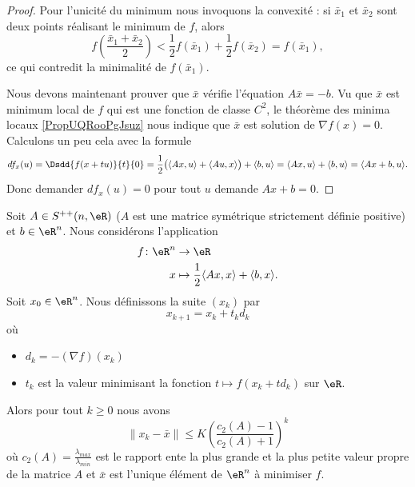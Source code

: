 \begin{proof}
    Pour l'unicité du minimum nous invoquons la convexité : si \( \bar x_1\) et \( \bar x_2\) sont deux points réalisant le minimum de \( f\), alors
    \begin{equation}
        f\left( \frac{ \bar x_1+\bar x_2 }{2} \right)<\frac{ 1 }{2}f(\bar x_1)+\frac{ 1 }{2}f(\bar x_2)=f(\bar x_1),
    \end{equation}
    ce qui contredit la minimalité de \( f(\bar x_1)\).

    Nous devons maintenant prouver que \( \bar x\) vérifie l'équation \( A\bar x=-b\). Vu que \( \bar x\) est minimum local de \( f\) qui est une fonction de classe \( C^2\), le théorème des minima locaux \ref{PropUQRooPgJsuz} nous indique que \( \bar x\) est solution de \( \nabla f(x)=0\). Calculons un peu cela avec la formule
    \begin{equation}
        df_x(u)=\Dsdd{ f(x+tu) }{t}{0}=\frac{ 1 }{2}\big( \langle Ax, u\rangle +\langle Au, x\rangle  \big)+\langle b, u\rangle =\langle Ax, u\rangle +\langle b, u\rangle =\langle Ax+b, u\rangle .
    \end{equation}
    Donc demander \( df_x(u)=0\) pour tout \( u\) demande \( Ax+b=0\).
\end{proof}

\begin{proposition} \label{PropSOOooGoMOxG}
    Soit \( A\in S^{++}(n,\eR)\) (\( A\) est une matrice symétrique strictement définie positive) et \( b\in \eR^n\). Nous considérons l'application
    \begin{equation}
        \begin{aligned}
            f\colon \eR^n&\to \eR \\
            x&\mapsto \frac{ 1 }{2}\langle Ax, x\rangle +\langle b, x\rangle . 
        \end{aligned}
    \end{equation}
    Soit \( x_0\in \eR^n\). Nous définissons la suite \( (x_k)\) par
    \begin{equation}
        x_{k+1}=x_k+t_kd_k
    \end{equation}
    où
    \begin{itemize}
        \item 
    \( d_k=-(\nabla f)(x_k)\) 
\item
    \( t_k\) est la valeur minimisant la fonction \( t\mapsto f(x_k+td_k)\) sur \( \eR\).
    \end{itemize}

    Alors pour tout \( k\geq 0\) nous avons
    \begin{equation}
        \| x_k-\bar x \|\leq K \left( \frac{ c_2(A)-1 }{ c_2(A)+1 } \right)^k
    \end{equation}
    où \( c_2(A)=\frac{ \lambda_{max} }{ \lambda_{min} }\) est le rapport ente la plus grande et la plus petite valeur propre de la matrice \( A\) et \( \bar x\) est l'unique élément de \( \eR^n\) à minimiser \( f\).
\end{proposition}

